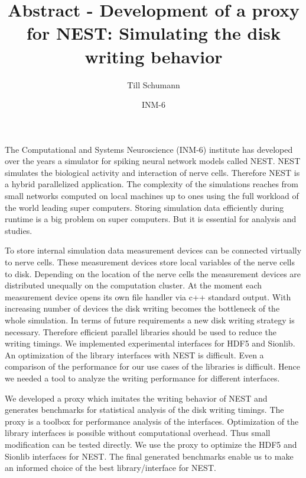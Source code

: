 \documentclass{article}
\title{Abstract - Development of a proxy for NEST: Simulating the disk writing behavior}
\author{Till Schumann}
\date{INM-6}
\begin{document}
   \maketitle

The Computational and Systems Neuroscience (INM-6) institute has developed over the years a simulator for spiking neural network models called NEST\cite{NEST}.
NEST simulates the biological activity and interaction of nerve cells. Therefore NEST is a hybrid parallelized application.
The complexity of the simulations reaches from small networks computed on local machines up to ones using the full workload of the world leading super computers.
Storing simulation data efficiently during runtime is a big problem on super computers.
But it is essential for analysis and studies.
\newline

To store internal simulation data measurement devices can be connected virtually to nerve cells.
These measurement devices store local variables of the nerve cells to disk.
Depending on the location of the nerve cells the measurement devices are distributed unequally on the computation cluster.
At the moment each measurement device opens its own file handler via c++ standard output.
With increasing number of devices the disk writing becomes the bottleneck of the whole simulation.
In terms of future requirements a new disk writing strategy is necessary.
Therefore efficient parallel libraries should be used to reduce the writing timings.
We implemented experimental interfaces for HDF5\cite{hdf2010hierarchical} and Sionlib\cite{frings2009scalable}. 
An optimization of the library interfaces with NEST is difficult.
Even a comparison of the performance for our use cases of the libraries is difficult.
Hence we needed a tool to analyze the writing performance for different interfaces.  
\newline

We developed a proxy which imitates the writing behavior of NEST and generates benchmarks for statistical analysis of the disk writing timings.
The proxy is a toolbox for performance analysis of the interfaces.
Optimization of the library interfaces is possible without computational overhead.
Thus small modification can be tested directly.
We use the proxy to optimize the HDF5 and Sionlib interfaces for NEST.
The final generated benchmarks enable us to make an informed choice of the best library/interface for NEST.




\end{document}
